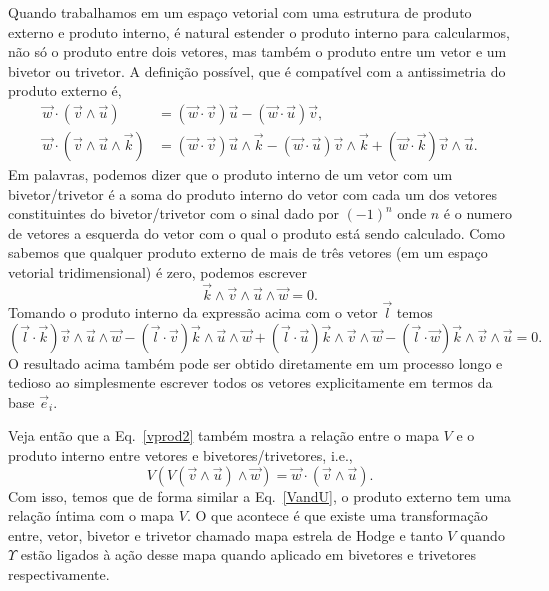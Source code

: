 Quando trabalhamos em um espaço vetorial com uma estrutura de produto externo e
produto interno, é natural estender o produto interno para calcularmos, não só o
produto entre dois vetores, mas também o produto entre um vetor e um bivetor ou
trivetor. A definição possível, que é compatível com a antissimetria do produto
externo é,
\begin{align}
	\vec{w}\cdot(\vec{v}\wedge\vec{u})              & = \left(\vec{w}\cdot\vec{v}\right)\vec{u}-\left(\vec{w}\cdot\vec{u}\right)\vec{v},                                                                                \\
	\vec{w}\cdot(\vec{v}\wedge\vec{u}\wedge\vec{k}) & = \left(\vec{w}\cdot\vec{v}\right)\vec{u}\wedge\vec{k}-\left(\vec{w}\cdot\vec{u}\right)\vec{v}\wedge\vec{k}+\left(\vec{w}\cdot\vec{k}\right)\vec{v}\wedge\vec{u}.
\end{align}
Em palavras, podemos dizer que o produto interno de um vetor com um
bivetor/trivetor é a soma do produto interno do vetor com cada um dos vetores
constituintes do bivetor/trivetor com o sinal dado por $(-1)^n$ onde $n$ é o
numero de vetores a esquerda do vetor com o qual o produto está sendo calculado.
Como sabemos que qualquer produto externo de mais de três vetores (em um espaço
vetorial tridimensional) é zero, podemos escrever
\begin{equation}
	\vec{k}\wedge\vec{v}\wedge\vec{u}\wedge\vec{w} = 0.
\end{equation}
Tomando o produto interno da expressão acima com o vetor $\vec{l}$ temos
\begin{equation}\label{intdet}
	\left(\vec{l}\cdot\vec{k}\right)\vec{v}\wedge\vec{u}\wedge\vec{w} - \left(\vec{l}\cdot\vec{v}\right)\vec{k}\wedge\vec{u}\wedge\vec{w} + \left(\vec{l}\cdot\vec{u}\right)\vec{k}\wedge\vec{v}\wedge\vec{w} - \left(\vec{l}\cdot\vec{w}\right)\vec{k}\wedge\vec{v}\wedge\vec{u}  = 0.
\end{equation}
O resultado acima também pode ser obtido diretamente em um processo longo e
tedioso ao simplesmente escrever todos os vetores explicitamente em termos da
base $\vec{e}_i$.

Veja então que a Eq.~\eqref{vprod2} também mostra a relação entre o mapa $V$ e o
produto interno entre vetores e bivetores/trivetores, i.e.,
\begin{equation}
	V\left(V\left(\vec{v}\wedge\vec{u}\right)\wedge\vec{w}\right) = \vec{w}\cdot(\vec{v}\wedge\vec{u}).
\end{equation}
Com isso, temos que de forma similar a Eq.~\eqref{VandU}, o produto externo tem
uma relação íntima com o mapa $V$. O que acontece é que existe uma transformação
entre, vetor, bivetor e trivetor chamado mapa estrela de Hodge e tanto $V$
quando $\Upsilon$ estão ligados à ação desse mapa quando aplicado em bivetores e
trivetores respectivamente.

